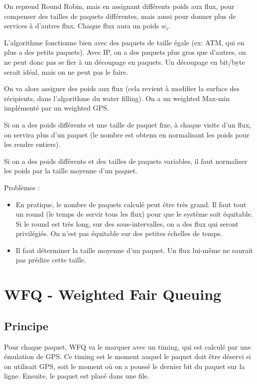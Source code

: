 			On reprend Round Robin, mais en assignant différents poids aux flux, pour compenser des tailles de paquets différentes, mais aussi pour donner plus de services à d'autres flux. Chaque flux aura un poids $w_i$.
			
			L'algorithme fonctionne bien avec des paquets de taille égale (ex: ATM, qui en plus a des petits paquets). Avec IP, on a des paquets plus gros que d'autres, on ne peut donc pas se fier à un découpage en paquets. Un découpage en bit/byte serait idéal, mais on ne peut pas le faire.
			
			On va alors assigner des poids aux flux (cela revient à modifier la surface des récipients, dans l'algorithme du water filling). On a un weighted Max-min implémenté par un weighted GPS.
			
			
			Si on a des poids différents et une taille de paquet fixe, à chaque visite d'un flux, on servira plus d'un paquet (le nombre est obtenu en normalisant les poids pour les rendre entiers).
			
			Si on a des poids différents et des tailles de paquets variables, il faut normaliser les poids par la taille moyenne d'un paquet.
			
			
			Problèmes :
			
			\begin{itemize}
				\item En pratique, le nombre de paquets calculé peut être très grand. Il faut tout un round (le temps de servir tous les flux) pour que le système soit équitable. Si le round est très long, sur des sous-intervalles, on a des flux qui seront privilégiés. On n'est pas équitable sur des petites échelles de temps.
				\item Il faut déterminer la taille moyenne d'un paquet. Un flux lui-même ne saurait pas prédire cette taille.
			\end{itemize}
						
			\section{WFQ - Weighted Fair Queuing}
			
			\subsection{Principe}
			Pour chaque paquet, WFQ va le marquer avec un timing, qui est calculé par une émulation de GPS. Ce timing est le moment auquel le paquet doit être déservi si on utilisait GPS, soit le moment où on a poussé le dernier bit du paquet sur la ligne. Ensuite, le paquet est placé dans une file.
			
